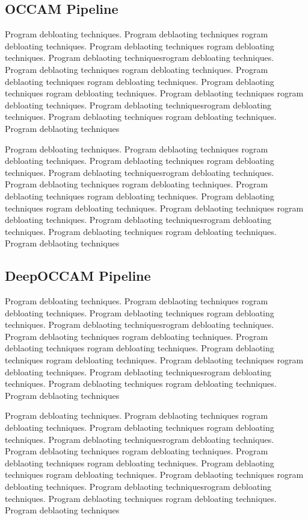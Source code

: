 \documentclass{relatorio}
\begin{document}
\subsection{OCCAM Pipeline}%
\label{Tools}

Program debloating techniques. Program deblaoting techniques rogram debloating techniques. Program deblaoting techniques
rogram debloating techniques. Program deblaoting techniquesrogram debloating techniques. Program deblaoting techniques
rogram debloating techniques. Program deblaoting techniques rogram debloating techniques. Program deblaoting techniques
rogram debloating techniques. Program deblaoting techniques 
rogram debloating techniques. Program deblaoting techniquesrogram debloating techniques. Program deblaoting techniques
rogram debloating techniques. Program deblaoting techniques

Program debloating techniques. Program deblaoting techniques rogram debloating techniques. Program deblaoting techniques
rogram debloating techniques. Program deblaoting techniquesrogram debloating techniques. Program deblaoting techniques
rogram debloating techniques. Program deblaoting techniques rogram debloating techniques. Program deblaoting techniques
rogram debloating techniques. Program deblaoting techniques 
rogram debloating techniques. Program deblaoting techniquesrogram debloating techniques. Program deblaoting techniques
rogram debloating techniques. Program deblaoting techniques

\subsection{DeepOCCAM Pipeline}%
\label{Tools}

Program debloating techniques. Program deblaoting techniques rogram debloating techniques. Program deblaoting techniques
rogram debloating techniques. Program deblaoting techniquesrogram debloating techniques. Program deblaoting techniques
rogram debloating techniques. Program deblaoting techniques rogram debloating techniques. Program deblaoting techniques
rogram debloating techniques. Program deblaoting techniques 
rogram debloating techniques. Program deblaoting techniquesrogram debloating techniques. Program deblaoting techniques
rogram debloating techniques. Program deblaoting techniques

Program debloating techniques. Program deblaoting techniques rogram debloating techniques. Program deblaoting techniques
rogram debloating techniques. Program deblaoting techniquesrogram debloating techniques. Program deblaoting techniques
rogram debloating techniques. Program deblaoting techniques rogram debloating techniques. Program deblaoting techniques
rogram debloating techniques. Program deblaoting techniques 
rogram debloating techniques. Program deblaoting techniquesrogram debloating techniques. Program deblaoting techniques
rogram debloating techniques. Program deblaoting techniques
\end{document}
